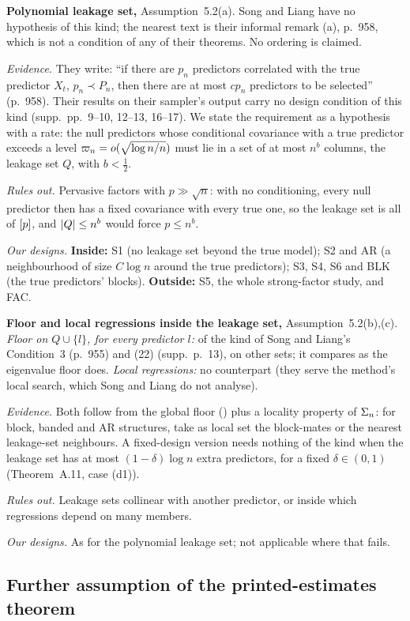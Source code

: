 \documentclass[11pt]{article}
\newcommand{\lab}[1]{\textup{(\asmdisp{#1})}}
\newcommand{\SL}{Song and Liang}
\newcommand{\ahead}[3]{\par\smallskip\noindent\textbf{#1} #2. #3\par}
\newcommand{\ev}[1]{\noindent\emph{Evidence.} #1\par}
\newcommand{\ro}[1]{\noindent\emph{Rules out.} #1\par}
\newcommand{\ds}[1]{\noindent\emph{Our designs.} #1\par}
\begin{document}
\ahead{Polynomial leakage set,}{Assumption~5.2(a)}{\SL{} have no hypothesis of this kind; the nearest text is their
informal remark (a), p.~958, which is not a condition of any of their theorems. No ordering is claimed.}
\ev{They write: ``if there are $p_n$ predictors correlated with the true predictor $X_t$, $p_n\prec P_n$, then there are
at most $cp_n$ predictors to be selected'' (p.~958). Their results on their sampler's output carry no design condition of
this kind (supp.\ pp.~9--10, 12--13, 16--17). We state the requirement as a hypothesis with a rate: the null predictors
whose conditional covariance with a true predictor exceeds a level $\varpi_n=o(\sqrt{\log n/n})$ must lie in a set of at most $n^b$
columns, the leakage set $Q$, with $b<\tfrac12$.}
\ro{Pervasive factors with $p\gg\sqrt n$: with no conditioning, every null predictor then has a fixed covariance with every
true one, so the leakage set is all of $[p]$, and $\lvert Q\rvert\le n^b$ would force $p\le n^b$.}
\ds{\textbf{Inside:} S1 (no leakage set beyond the true model); S2 and AR (a neighbourhood of size $C\log n$ around the true
predictors); S3, S4, S6 and BLK (the true predictors' blocks). \textbf{Outside:} S5, the whole strong-factor study, and
FAC.}

\ahead{Floor and local regressions inside the leakage set,}{Assumption~5.2(b),(c)}{\emph{Floor on $Q\cup\{l\}$,
for every predictor $l$:} of the kind of \SL's Condition~3
(p.~955) and (22) (supp.\ p.~13), on other sets; it compares as the eigenvalue floor does. \emph{Local regressions:} no
counterpart (they serve the method's local search, which \SL{} do not analyse).}
\ev{Both follow from the global floor \lab{EFS} plus a locality property of $\Sigma_n$: for block, banded and AR structures,
take as local set the block-mates or the nearest leakage-set neighbours. A fixed-design version needs nothing of the kind
when the leakage set has at most $(1-\delta)\log n$ extra predictors, for a fixed $\delta\in(0,1)$ (Theorem~A.11, case
(d1)).}
\ro{Leakage sets collinear with another predictor, or inside which regressions depend on many members.}
\ds{As for the polynomial leakage set; not applicable where that fails.}

\subsection{Further assumption of the printed-estimates theorem}\label{sec:a-pe}
\end{document}
